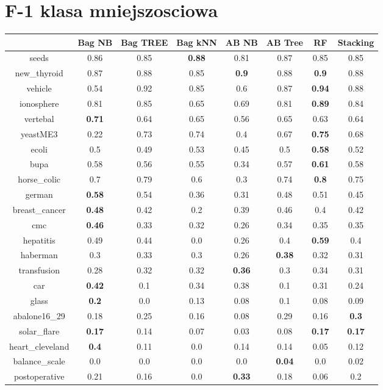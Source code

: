 \documentclass{article}%
\begin{document}
\section*{F{-}1 klasa mniejszosciowa}%
\begin{tabular}{c|ccccccc}%
&Bag NB&Bag TREE&Bag kNN&AB NB&AB Tree&RF&Stacking\\%
\hline%
seeds&0.86&0.85&\textbf{0.88}&0.81&0.87&0.85&0.85\\%
new\_thyroid&0.87&0.88&0.85&\textbf{0.9}&0.88&\textbf{0.9}&0.88\\%
vehicle&0.54&0.92&0.85&0.6&0.87&\textbf{0.94}&0.88\\%
ionosphere&0.81&0.85&0.65&0.69&0.81&\textbf{0.89}&0.84\\%
vertebal&\textbf{0.71}&0.64&0.65&0.56&0.65&0.63&0.64\\%
yeastME3&0.22&0.73&0.74&0.4&0.67&\textbf{0.75}&0.68\\%
ecoli&0.5&0.49&0.53&0.45&0.5&\textbf{0.58}&0.52\\%
bupa&0.58&0.56&0.55&0.34&0.57&\textbf{0.61}&0.58\\%
horse\_colic&0.7&0.79&0.6&0.3&0.74&\textbf{0.8}&0.75\\%
german&\textbf{0.58}&0.54&0.36&0.31&0.48&0.51&0.45\\%
breast\_cancer&\textbf{0.48}&0.42&0.2&0.39&0.46&0.4&0.42\\%
cmc&\textbf{0.46}&0.33&0.32&0.26&0.34&0.35&0.35\\%
hepatitis&0.49&0.44&0.0&0.26&0.4&\textbf{0.59}&0.4\\%
haberman&0.3&0.33&0.3&0.26&\textbf{0.38}&0.32&0.31\\%
transfusion&0.28&0.32&0.32&\textbf{0.36}&0.3&0.34&0.31\\%
car&\textbf{0.42}&0.1&0.34&0.38&0.1&0.31&0.24\\%
glass&\textbf{0.2}&0.0&0.13&0.08&0.1&0.08&0.09\\%
abalone16\_29&0.18&0.25&0.16&0.08&0.29&0.16&\textbf{0.3}\\%
solar\_flare&\textbf{0.17}&0.14&0.07&0.03&0.08&\textbf{0.17}&\textbf{0.17}\\%
heart\_cleveland&\textbf{0.4}&0.11&0.0&0.14&0.14&0.05&0.12\\%
balance\_scale&0.0&0.0&0.0&0.0&\textbf{0.04}&0.0&0.02\\%
postoperative&0.21&0.16&0.0&\textbf{0.33}&0.18&0.06&0.2\\%
\end{tabular}

%
\end{document}
